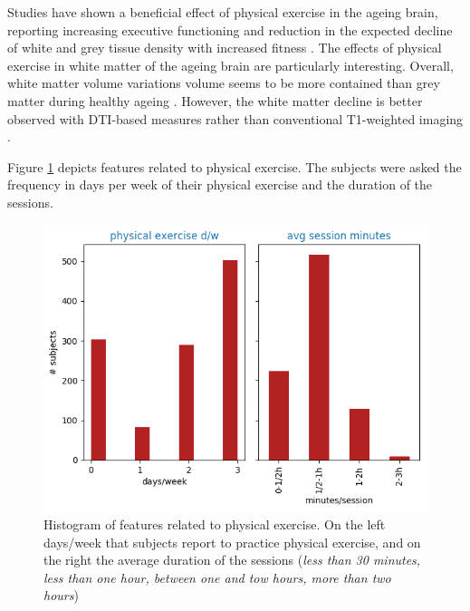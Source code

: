 \documentclass[11pt]{article}
\theoremstyle{definition}
\theoremstyle{remark}
\begin{document}
Studies have shown a beneficial effect of physical exercise in the ageing brain, reporting increasing executive functioning and reduction in the expected decline of white and grey tissue density with increased fitness \cite{colcombe2003aerobic}. The effects of physical exercise in white matter of the ageing brain are particularly interesting. Overall, white matter volume variations volume seems to be more contained than grey matter during healthy ageing \cite{bartzokis2003white}. However, the white matter decline is better observed with DTI-based measures rather than conventional T1-weighted imaging \cite{giorgio2010age}.


Figure \ref{fig:phys} depicts features related to physical exercise. The subjects were asked the frequency in days per week of their physical exercise and the duration of the sessions.
\begin{figure}[H]
        \centering
        \includegraphics[keepaspectratio, width=0.6\linewidth]{figures/Fig_phys}
        \caption{Histogram of features related to physical exercise. On the left days/week that subjects report to practice physical exercise, and on the right the average duration of the sessions (\emph{less than 30 minutes, less than one hour, between one and tow hours, more than two hours})} 
        \label{fig:phys}
\end{figure}

\end{document}

